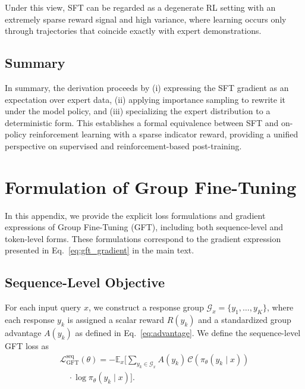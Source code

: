 Under this view, SFT can be regarded as a degenerate RL setting with an extremely sparse reward signal and high variance, where learning occurs only through trajectories that coincide exactly with expert demonstrations.

\subsection{Summary}

In summary, the derivation proceeds by (i) expressing the SFT gradient as an expectation over expert data, (ii) applying importance sampling to rewrite it under the model policy, and (iii) specializing the expert distribution to a deterministic form. This establishes a formal equivalence between SFT and on-policy reinforcement learning with a sparse indicator reward, providing a unified perspective on supervised and reinforcement-based post-training.

\section{Formulation of Group Fine-Tuning}
\label{sec:formulation}

In this appendix, we provide the explicit loss formulations and gradient expressions of Group Fine-Tuning (GFT), including both sequence-level and token-level forms. These formulations correspond to the gradient expression presented in Eq.~\eqref{eq:gft_gradient} in the main text.

\subsection{Sequence-Level Objective}
\label{subsec:seq_level_obj}

For each input query \(x\), we construct a response group
\(
\mathcal{G}_x = \{y_1, \ldots, y_K\}
\),
where each response \(y_k\) is assigned a scalar reward \(R(y_k)\) and a standardized
group advantage \(A(y_k)\) as defined in Eq.~\eqref{eq:advantage}. We define the sequence-level GFT loss as
\begin{equation}
\begin{aligned}
\mathcal{L}_{\mathrm{GFT}}^{\mathrm{seq}}(\theta)
=
-
\mathbb{E}_{x}
\Bigg[
\sum_{y_k \in \mathcal{G}_x}
A(y_k)\,
\mathcal{C}\!\left(\pi_\theta(y_k \mid x)\right)
\\[-1mm]
\quad\cdot
\log \pi_\theta(y_k \mid x)
\Bigg].
\end{aligned}
\label{eq:gft_loss_seq}
\end{equation}

